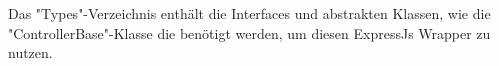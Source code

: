 
Das "Types"-Verzeichnis enthält die Interfaces und abstrakten Klassen, wie die "ControllerBase"-Klasse die benötigt werden, um diesen ExpressJs Wrapper zu nutzen.
